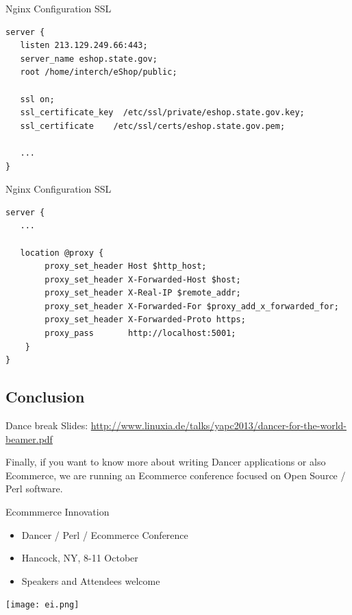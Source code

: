 \begin{frame}[fragile]{Nginx Configuration SSL}
\begin{lstlisting}
server {
   listen 213.129.249.66:443;
   server_name eshop.state.gov;
   root /home/interch/eShop/public;

   ssl on;
   ssl_certificate_key  /etc/ssl/private/eshop.state.gov.key;
   ssl_certificate    /etc/ssl/certs/eshop.state.gov.pem;

   ...
}
\end{lstlisting}
\end{frame}

\begin{frame}[fragile]{Nginx Configuration SSL}
\begin{lstlisting}
server {
   ...

   location @proxy {
        proxy_set_header Host $http_host;
        proxy_set_header X-Forwarded-Host $host;
        proxy_set_header X-Real-IP $remote_addr;
        proxy_set_header X-Forwarded-For $proxy_add_x_forwarded_for;
        proxy_set_header X-Forwarded-Proto https;
        proxy_pass       http://localhost:5001;
    }
}
\end{lstlisting}
\end{frame}

\subsection{Conclusion}
\begin{frame}{Dance break}
Slides:
\url{http://www.linuxia.de/talks/yapc2013/dancer-for-the-world-beamer.pdf}
\end{frame}

Finally, if you want to know more about writing Dancer applications
or also Ecommerce, we are running an Ecommerce conference focused
on Open Source / Perl software.

\begin{frame}{Ecommmerce Innovation}
\begin{itemize}
\item Dancer / Perl / Ecommerce Conference
\item Hancock, NY, 8-11 October
\item Speakers and Attendees welcome
\end{itemize}
\texttt{[image: ei.png]}
\end{frame}



